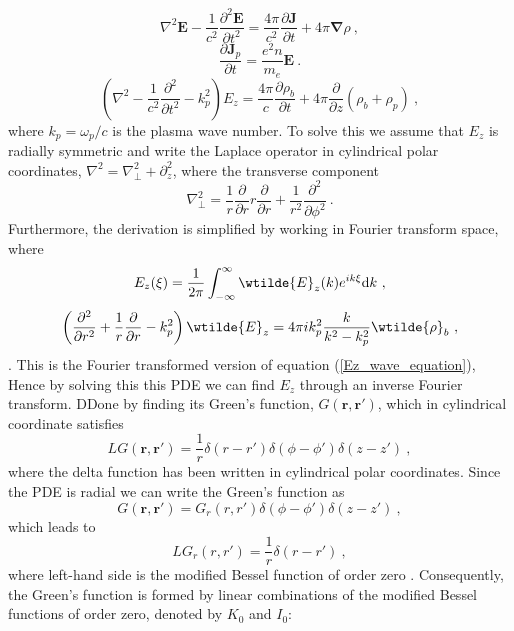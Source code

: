 \documentclass[%
onecolumn, notitlepage,
 amsmath,amssymb,
 aps,
]{article}
\renewcommand{\vec}[1]{\mathbf{#1}}
\renewcommand{\vec}[1]{\mathbf{#1}}
\begin{document}
\begin{equation}
\nabla^2\vec{E}-\frac{1}{c^2}\frac{\partial^2 \vec{E}}{\partial t^2}=\frac{4\pi}{c^2}\frac{\partial \vec{J}}{\partial t}+4\pi\boldsymbol{\nabla}\rho~,
\end{equation}
\begin{equation}
\frac{\partial \vec{J}_p}{\partial t}=\frac{e^2 n}{m_e}\vec{E}~.
\end{equation}
\begin{equation}
\left(\nabla^2-\frac{1}{c^2}\frac{\partial^2}{\partial t^2}-k_p^2\right)E_z=\frac{4\pi}{c}\frac{\partial \rho_b}{\partial t}+4\pi\frac{\partial}{\partial z}\left(\rho_b+\rho_p\right)~,
\end{equation}
where $k_p=\omega_p/c$ is the plasma wave number. To solve this we assume that $E_z$ is radially symmetric and write the Laplace operator in cylindrical polar coordinates, $\nabla^2=\nabla^2_{\perp}+\partial^2_z$, where the transverse component
\begin{equation}
\nabla_{\perp}^2=\frac{1}{r}\frac{\partial }{\partial r}r\frac{\partial }{\partial r} +\frac{1}{r^2}\frac{\partial^2 }{\partial \phi^2} ~.
\end{equation}
Furthermore, the derivation is simplified by working in Fourier transform space, where
\begin{equation}
E_z(\xi)=\frac{1}{2\pi}\int_ {-\infty}^{\infty}\wtilde{E}_z(k)e^{ik\xi}\mathrm{d}k~,
\end{equation}
\begin{equation}
 \left(\frac{\partial^2 }{\partial r^2}+\frac{1}{r}\frac{\partial }{\partial r} -k^2_p\right)\wtilde{E}_z
=4\pi ik_p^2 \frac{k}{k^2-k_p^2}\wtilde{\rho}_b~,
\end{equation}
. This is the Fourier transformed version of equation (\ref{Ez_wave_equation}), Hence by solving this this PDE we can find $E_z$ through an inverse Fourier transform. DDone by finding its Green's function, $G(\vec{r},\vec{r}')$, which in cylindrical coordinate satisfies
\begin{equation}
LG(\vec{r},\vec{r}')=\frac{1}{r}\delta(r-r')\delta(\phi-\phi')\delta(z-z')~,
\end{equation}
where the delta function has been written in cylindrical polar coordinates. Since the PDE is radial we can write the Green's function as
\begin{equation}
G(\vec{r},\vec{r}')=G_r(r,r')\delta(\phi-\phi')\delta(z-z')~,
\end{equation}
which leads to 
\begin{equation}
LG_r(r,r')=\frac{1}{r}\delta(r-r')~,
\end{equation}
where left-hand side is the modified Bessel function of order zero \cite{Jackson1962}. Consequently, the Green's function is formed by linear combinations of the modified Bessel functions of order zero, denoted by $K_0$ and $I_0$: %
\end{document}
